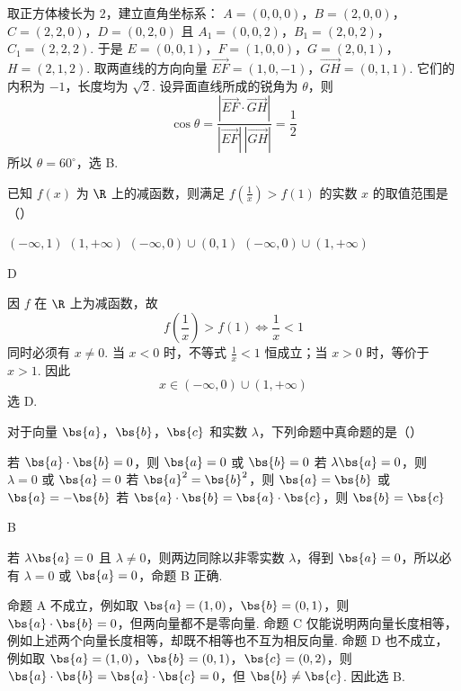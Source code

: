 \begin{solution}
取正方体棱长为 \(2\)，建立直角坐标系：
\(A=(0,0,0)\)，\(B=(2,0,0)\)，\(C=(2,2,0)\)，\(D=(0,2,0)\)
且 \(A_1=(0,0,2)\)，\(B_1=(2,0,2)\)，\(C_1=(2,2,2)\). 于是
\(E=(0,0,1)\)，\(F=(1,0,0)\)，\(G=(2,0,1)\)，\(H=(2,1,2)\).
取两直线的方向向量
\(\overrightarrow{EF}=(1,0,-1)\)，\(\overrightarrow{GH}=(0,1,1)\).
它们的内积为 \(-1\)，长度均为 \(\sqrt2\). 设异面直线所成的锐角为 \(\theta\)，则
\[
\cos\theta=\frac{|\overrightarrow{EF}\cdot\overrightarrow{GH}|}{|\overrightarrow{EF}|\,|\overrightarrow{GH}|}=\frac{1}{2}
\]
所以 \(\theta=60^\circ\)，选 B.
\end{solution}

\begin{problem}
已知 \(f(x)\) 为 \(\R\) 上的减函数，则满足 \(f\left( \frac{1}{x} \right) > f(1)\) 的实数 \(x\) 的取值范围是（\quad）

\choices
    {\((-\infty, 1)\)}
    {\((1, +\infty)\)}
    {\((-\infty, 0) \cup (0, 1)\)}
    {\((-\infty, 0) \cup (1, +\infty)\)}
\end{problem}

\begin{answer}
D
\end{answer}

\begin{solution}
因 \(f\) 在 \(\R\) 上为减函数，故
\[
f\left(\frac1x\right)>f(1)\Longleftrightarrow \frac1x<1
\]
同时必须有 \(x\neq0\). 当 \(x<0\) 时，不等式 \(\frac1x<1\) 恒成立；当 \(x>0\) 时，等价于 \(x>1\). 因此
\[
x\in(-\infty,0)\cup(1,+\infty)
\]
选 D.
\end{solution}

\begin{problem}
对于向量 \(\bs{a}\)，\(\bs{b}\)，\(\bs{c}\) 和实数 \(\lambda\)，下列命题中真命题的是（\quad）

\choices
    {若 \(\bs{a} \cdot \bs{b} = 0\)，则 \(\bs{a} = 0\) 或 \(\bs{b} = 0\)}
    {若 \(\lambda\bs{a} = 0\)，则 \(\lambda = 0\) 或 \(\bs{a} = 0\)}
    {若 \(\bs{a}^2 = \bs{b}^2\)，则 \(\bs{a} = \bs{b}\) 或 \(\bs{a} = -\bs{b}\)}
    {若 \(\bs{a} \cdot \bs{b} = \bs{a} \cdot \bs{c}\)，则 \(\bs{b} = \bs{c}\)}
\end{problem}

\begin{answer}
B
\end{answer}

\begin{solution}
若 \(\lambda\bs{a}=0\) 且 \(\lambda\neq0\)，则两边同除以非零实数 \(\lambda\)，得到 \(\bs{a}=0\)，所以必有 \(\lambda=0\) 或 \(\bs{a}=0\)，命题 B 正确.

命题 A 不成立，例如取 \(\bs{a}=(1,0)\)，\(\bs{b}=(0,1)\)，则 \(\bs{a}\cdot\bs{b}=0\)，但两向量都不是零向量. 命题 C 仅能说明两向量长度相等，例如上述两个向量长度相等，却既不相等也不互为相反向量. 命题 D 也不成立，例如取 \(\bs{a}=(1,0)\)，\(\bs{b}=(0,1)\)，\(\bs{c}=(0,2)\)，则 \(\bs{a}\cdot\bs{b}=\bs{a}\cdot\bs{c}=0\)，但 \(\bs{b}\neq\bs{c}\). 因此选 B.
\end{solution}


